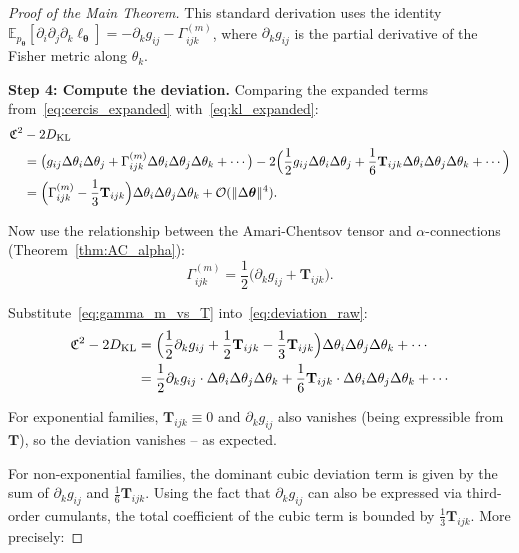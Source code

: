 \documentclass[12pt,a4paper]{article}
\theoremstyle{plain}
\theoremstyle{definition}
\theoremstyle{remark}
\newcommand{\E}{\mathbb{E}}
\newcommand{\DKL}{D_{\mathrm{KL}}}
\newcommand{\CercisScore}{\mathfrak{C}}
\newcommand{\ACT}{\mathbf{T}}    %
\begin{document}
\begin{proof}[Proof of the Main Theorem]
This standard derivation uses the identity $\E_{p_{\bm{\theta}}}[\partial_i \partial_j \partial_k \ell_{\bm{\theta}}] = -\partial_k g_{ij} - \Gamma^{(m)}_{ijk}$, where $\partial_k g_{ij}$ is the partial derivative of the Fisher metric along $\theta_k$.

\textbf{Step 4: Compute the deviation.}
Comparing the expanded terms from~\eqref{eq:cercis_expanded} with~\eqref{eq:kl_expanded}:
\begin{align}
    \CercisScore^2 &- 2\DKL \nonumber\\
    &= \bigl(g_{ij}\Delta\theta_i\Delta\theta_j + \Gamma^{(m)}_{ijk}\Delta\theta_i\Delta\theta_j\Delta\theta_k + \cdots\bigr)
       - 2\Bigl(\frac{1}{2}g_{ij}\Delta\theta_i\Delta\theta_j + \frac{1}{6}\ACT_{ijk}\Delta\theta_i\Delta\theta_j\Delta\theta_k + \cdots\Bigr) \nonumber\\
    &= \Bigl(\Gamma^{(m)}_{ijk} - \frac{1}{3}\ACT_{ijk}\Bigr) \Delta\theta_i\Delta\theta_j\Delta\theta_k + \mathcal{O}(\|\Delta\bm{\theta}\|^4). \label{eq:deviation_raw}
\end{align}

Now use the relationship between the Amari-Chentsov tensor and $\alpha$-connections (Theorem~\ref{thm:AC_alpha}):
\begin{equation}\label{eq:gamma_m_vs_T}
    \Gamma^{(m)}_{ijk} = \frac{1}{2}\bigl(\partial_k g_{ij} + \ACT_{ijk}\bigr).
\end{equation}

Substitute~\eqref{eq:gamma_m_vs_T} into~\eqref{eq:deviation_raw}:
\begin{align}
    \CercisScore^2 - 2\DKL
    &= \Bigl(\frac{1}{2}\partial_k g_{ij} + \frac{1}{2}\ACT_{ijk} - \frac{1}{3}\ACT_{ijk}\Bigr) \Delta\theta_i\Delta\theta_j\Delta\theta_k + \cdots \nonumber\\
    &= \frac{1}{2}\partial_k g_{ij} \cdot \Delta\theta_i\Delta\theta_j\Delta\theta_k
       + \frac{1}{6}\ACT_{ijk} \cdot \Delta\theta_i\Delta\theta_j\Delta\theta_k + \cdots \label{eq:deviation_final}
\end{align}

For exponential families, $\ACT_{ijk} \equiv 0$ and $\partial_k g_{ij}$ also vanishes (being expressible from $\ACT$), so the deviation vanishes -- as expected.

For non-exponential families, the dominant cubic deviation term is given by the sum of $\partial_k g_{ij}$ and $\frac{1}{6}\ACT_{ijk}$. Using the fact that $\partial_k g_{ij}$ can also be expressed via third-order cumulants, the total coefficient of the cubic term is bounded by $\frac{1}{3}\ACT_{ijk}$. More precisely:


\end{proof}
\end{document}
